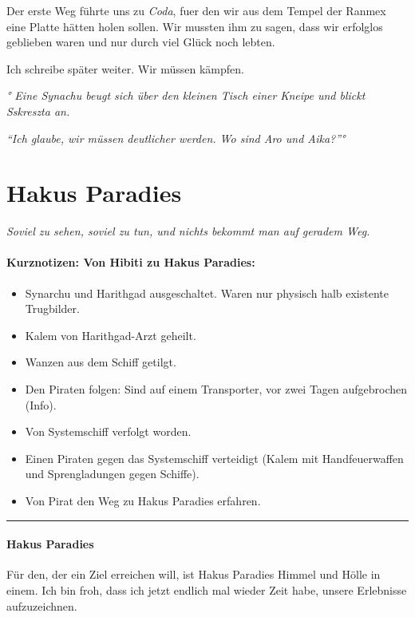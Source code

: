 \documentclass[11pt]{article}
\begin{document}
Der erste Weg führte uns zu \emph{Coda}, fuer den wir aus dem Tempel der
Ranmex eine Platte hätten holen sollen. Wir mussten ihm zu sagen, dass
wir erfolglos geblieben waren und nur durch viel Glück noch lebten.

Ich schreibe später weiter. Wir müssen kämpfen.

\emph{° Eine Synachu beugt sich über den kleinen Tisch einer Kneipe und
blickt Sskreszta an.}

\emph{``Ich glaube, wir müssen deutlicher werden. Wo sind Aro und
Aika?''°}

\section{Hakus Paradies}

\emph{Soviel zu sehen, soviel zu tun, und nichts bekommt man auf geradem
Weg.}

\paragraph{Kurznotizen: Von Hibiti zu Hakus Paradies:}

\begin{itemize}
\item
  Synarchu und Harithgad ausgeschaltet. Waren nur physisch halb
  existente Trugbilder.
\item
  Kalem von Harithgad-Arzt geheilt.
\item
  Wanzen aus dem Schiff getilgt.
\item
  Den Piraten folgen: Sind auf einem Transporter, vor zwei Tagen
  aufgebrochen (Info).
\item
  Von Systemschiff verfolgt worden.
\item
  Einen Piraten gegen das Systemschiff verteidigt (Kalem mit
  Handfeuerwaffen und Sprengladungen gegen Schiffe).
\item
  Von Pirat den Weg zu Hakus Paradies erfahren.
\end{itemize}
\begin{center}\rule{3in}{0.4pt}\end{center}

\paragraph{Hakus Paradies}

Für den, der ein Ziel erreichen will, ist Hakus Paradies Himmel und
Hölle in einem. Ich bin froh, dass ich jetzt endlich mal wieder Zeit
habe, unsere Erlebnisse aufzuzeichnen.
\end{document}
